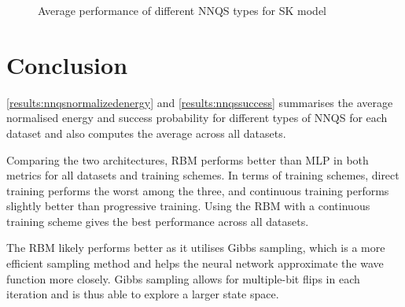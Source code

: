\begin{figure}[!htb]
    \centering
    \caption{Average performance of different NNQS types for SK model}
    \label{nnqs-skmodel-average}
\end{figure}

\section{Conclusion}
\autoref{results:nnqsnormalizedenergy} and \autoref{results:nnqssuccess} summarises the average normalised energy and success probability for different types of NNQS for each dataset and also computes the average across all datasets.

Comparing the two architectures, RBM performs better than MLP in both metrics for all datasets and training schemes. In terms of training schemes, direct training performs the worst among the three, and continuous training performs slightly better than progressive training. Using the RBM with a continuous training scheme gives the best performance across all datasets. 

The RBM likely performs better as it utilises Gibbs sampling, which is a more efficient sampling method and helps the neural network approximate the wave function more closely. Gibbs sampling allows for multiple-bit flips in each iteration and is thus able to explore a larger state space.

